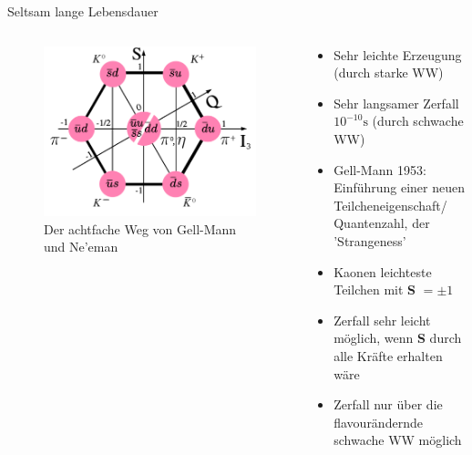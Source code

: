 \documentclass[aspectratio=1610, professionalfonts, 9pt, t]{beamer}
\begin{document}
  \begin{frame}{Seltsam lange Lebensdauer}
    \begin{columns}[onlytextwidth]
      \begin{column}{0.4\textwidth}
        \begin{figure}[ht]
          \begin{center}
            \includegraphics[height=0.6\textheight]{Images/Meson-octet.png} %
            \caption{Der achtfache Weg von Gell-Mann und Ne'eman}
          \end{center}
        \end{figure}
      \end{column}
      \begin{column}{0.5\textwidth}
        \begin{itemize}
          \item Sehr leichte Erzeugung (durch starke WW)
          \item Sehr langsamer Zerfall $10^{-10}\si{\second}$ (durch schwache WW)
          \item Gell-Mann 1953: Einführung einer neuen Teilcheneigenschaft/ Quantenzahl, der 'Strangeness'
          \item Kaonen leichteste Teilchen mit \textbf{S} $= \pm1$
          \item Zerfall sehr leicht möglich, wenn \textbf{S} durch alle Kräfte erhalten wäre
          \item Zerfall nur über die flavourändernde schwache WW möglich
        \end{itemize}
      \end{column}
    \end{columns}
  \end{frame}
\end{document}
